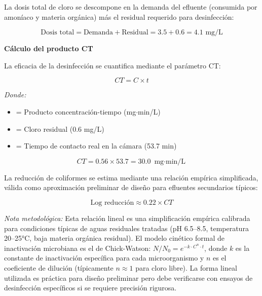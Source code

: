 \documentclass[12pt,a4paper]{article}
\begin{document}
La dosis total de cloro se descompone en la demanda del efluente (consumida por amoníaco y materia orgánica) más el residual requerido para desinfección:

\begin{equation}
\text{Dosis total} = \text{Demanda} + \text{Residual} = 3.5 + 0.6 = 4.1 \text{ mg/L}
\end{equation}

\textbf{Cálculo del producto CT}

La eficacia de la desinfección se cuantifica mediante el parámetro CT:

\begin{equation}
CT = C \times t
\end{equation}

\textit{Donde:}
\begin{itemize}[noitemsep,leftmargin=2em]
    \item[$CT$] = Producto concentración-tiempo (mg$\cdot$min/L)
    \item[$C$] = Cloro residual (0.6 mg/L)
    \item[$t$] = Tiempo de contacto real en la cámara (53.7 min)
\end{itemize}

\begin{equation}
CT = 0.56 \times 53.7 = 30.0 \text{ mg$\cdot$min/L}
\end{equation}

La reducción de coliformes se estima mediante una relación empírica simplificada, válida como aproximación preliminar de diseño para efluentes secundarios típicos:

\begin{equation}
\text{Log reducción} \approx 0.22 \times CT
\end{equation}

\textit{Nota metodológica:} Esta relación lineal es una simplificación empírica calibrada para condiciones típicas de aguas residuales tratadas (pH 6.5--8.5, temperatura 20--25°C, baja materia orgánica residual). El modelo cinético formal de inactivación microbiana es el de Chick-Watson: $N/N_0 = e^{-k \cdot C^n \cdot t}$, donde $k$ es la constante de inactivación específica para cada microorganismo y $n$ es el coeficiente de dilución (típicamente $n \approx 1$ para cloro libre). La forma lineal utilizada es práctica para diseño preliminar pero debe verificarse con ensayos de desinfección específicos si se requiere precisión rigurosa.
\end{document}

